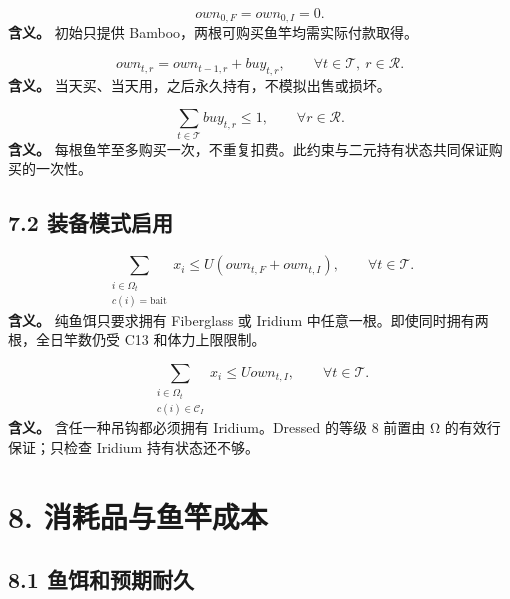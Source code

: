 \documentclass[11pt,a4paper]{article}
\begin{document}
\begin{samepage}
\[
own_{0,F}=own_{0,I}=0. \tag{C17}
\]
\textbf{含义。} 初始只提供 Bamboo，两根可购买鱼竿均需实际付款取得。\par
\end{samepage}

\begin{samepage}
\[
own_{t,r}=own_{t-1,r}+buy_{t,r},
\qquad \forall t\in\mathcal T,\ r\in\mathcal R. \tag{C18}
\]
\textbf{含义。} 当天买、当天用，之后永久持有，不模拟出售或损坏。\par
\end{samepage}

\begin{samepage}
\[
\sum_{t\in\mathcal T}buy_{t,r}\le1,\qquad \forall r\in\mathcal R. \tag{C19}
\]
\textbf{含义。} 每根鱼竿至多购买一次，不重复扣费。此约束与二元持有状态共同保证购买的一次性。\par
\end{samepage}

\subsection*{7.2 装备模式启用}

\begin{samepage}
\[
\sum_{\substack{i\in\Omega_t\\c(i)=\mathrm{bait}}}x_i
\le U(own_{t,F}+own_{t,I}),\qquad \forall t\in\mathcal T. \tag{C20}
\]
\textbf{含义。} 纯鱼饵只要求拥有 Fiberglass 或 Iridium 中任意一根。即使同时拥有两根，全日竿数仍受 C13 和体力上限限制。\par
\end{samepage}

\begin{samepage}
\[
\sum_{\substack{i\in\Omega_t\\c(i)\in\mathcal C_I}}x_i
\le Uown_{t,I},\qquad \forall t\in\mathcal T. \tag{C21}
\]
\textbf{含义。} 含任一种吊钩都必须拥有 Iridium。Dressed 的等级 8 前置由 Ω 的有效行保证；只检查 Iridium 持有状态还不够。\par
\end{samepage}

\section*{\color{modelblue}8. 消耗品与鱼竿成本}

\subsection*{8.1 鱼饵和预期耐久}
\end{document}
